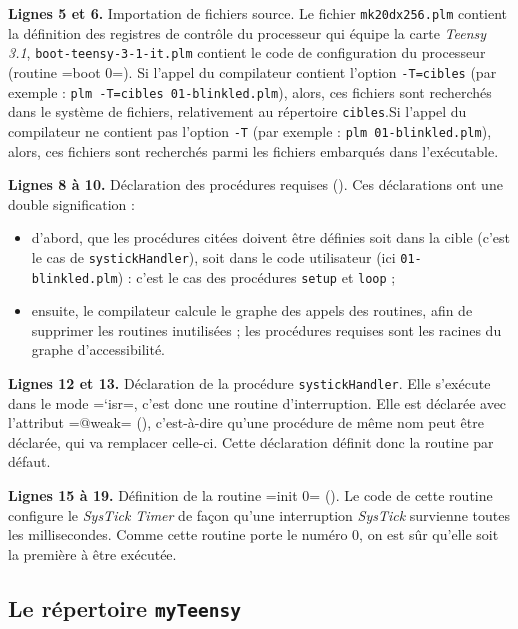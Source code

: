 {\bf Lignes 5 et 6.} Importation de fichiers source. Le fichier \texttt{mk20dx256.plm} contient la définition des registres de contrôle du processeur qui équipe la carte \emph{Teensy 3.1}, \texttt{boot-teensy-3-1-it.plm} contient le code de configuration du processeur (routine \plm=boot 0=). Si l'appel du compilateur contient l'option \texttt{-T=cibles} (par exemple : \texttt{plm -T=cibles 01-blinkled.plm}), alors, ces fichiers sont recherchés dans le système de fichiers, relativement au répertoire \texttt{cibles}.Si l'appel du compilateur ne contient pas l'option \texttt{-T} (par exemple : \texttt{plm 01-blinkled.plm}), alors, ces fichiers sont recherchés parmi les fichiers embarqués dans l'exécutable.



{\bf Lignes 8 à 10.} Déclaration des procédures requises (). Ces déclarations ont une double signification :
\begin{itemize}
  \item d'abord, que les procédures citées doivent être définies soit dans la cible (c'est le cas de \texttt{systickHandler}), soit dans le code utilisateur (ici \texttt{01-blinkled.plm}) : c'est le cas des procédures \texttt{setup} et \texttt{loop} ;
  \item ensuite, le compilateur calcule le graphe des appels des routines, afin de supprimer les routines inutilisées ; les procédures requises sont les racines du graphe d'accessibilité.
\end{itemize}

{\bf Lignes 12 et 13.} Déclaration de la procédure \texttt{systickHandler}. Elle s'exécute dans le mode \plm=`isr=, c'est donc une routine d'interruption. Elle est déclarée avec l'attribut \plm=@weak= (), c'est-à-dire qu'une procédure de même nom peut être déclarée, qui va remplacer celle-ci. Cette déclaration définit donc la routine par défaut.

{\bf Lignes 15 à 19.} Définition de la routine \plm=init 0= (). Le code de cette routine configure le \emph{SysTick Timer} de façon qu'une interruption \emph{SysTick} survienne toutes les millisecondes. Comme cette routine porte le numéro $0$, on est sûr qu'elle soit la première à être exécutée.






\subsection{Le répertoire \texttt{myTeensy}}

